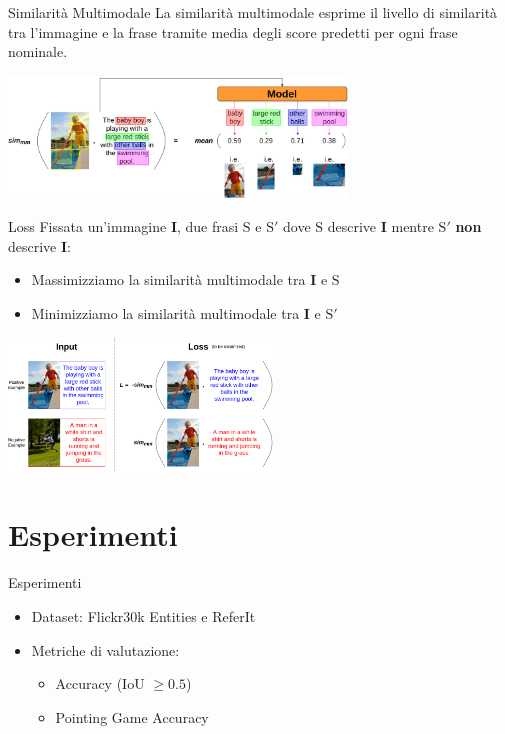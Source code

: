 \documentclass{beamer}
\begin{document}
\begin{frame}{Similarità Multimodale}
  La similarità multimodale esprime il \alert{livello di similarità
  tra l'immagine e la frase} tramite media degli score
  predetti per ogni frase nominale.
  
  \vspace{1cm}

  \centering
  \includegraphics[width=9cm]{images/sim-mm.png}
\end{frame}

\begin{frame}{Loss}
  Fissata un'immagine $\bm{I}$, due frasi $\text{S}$ e $\text{S}'$
  dove $\text{S}$ descrive $\bm{I}$ mentre $\text{S}'$ \textbf{non}
  descrive $\bm{I}$:
  \begin{itemize}
    \item \alert{Massimizziamo} la similarità multimodale tra $\bm{I}$
    e $\text{S}$
    \item \alert{Minimizziamo} la similarità multimodale tra $\bm{I}$
    e $\text{S}'$
  \end{itemize}
  
  \vspace{0.5cm}

  \centering
  \includegraphics[width=7cm]{images/loss.png}
\end{frame}

\section{Esperimenti}

\begin{frame}{Esperimenti}
  \begin{itemize}
    \item Dataset: \alert{Flickr30k Entities} e \alert{ReferIt}
    \item Metriche di valutazione:
    \begin{itemize}
      \item \alert{Accuracy} (IoU $\geq 0.5$)
      \item Pointing Game Accuracy
    \end{itemize}
  \end{itemize}
\end{frame}
\end{document}
